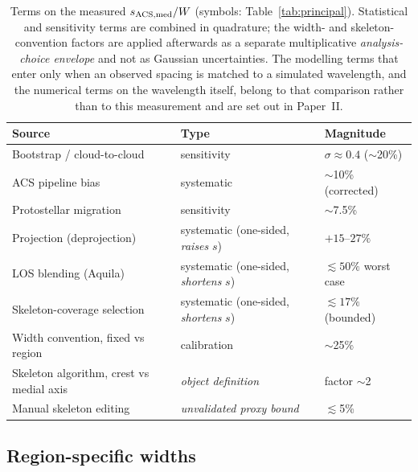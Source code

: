 \documentclass[usenatbib,twoside,twocolumn]{mnras}
\begin{document}
\begin{table}
\caption{Terms on the measured $s_{\rm ACS,med}/W$ (symbols: Table~\ref{tab:principal}). Statistical and sensitivity terms are combined in quadrature; the width- and skeleton-convention factors are applied afterwards as a separate multiplicative \emph{analysis-choice envelope} and not as Gaussian uncertainties. The modelling terms that enter only when an observed spacing is matched to a simulated wavelength, and the numerical terms on the wavelength itself, belong to that comparison rather than to this measurement and are set out in Paper~II.}
\label{tab:errorbudget}
\footnotesize
\setlength{\tabcolsep}{3pt}
\begin{tabular}{@{}p{3.1cm}p{1.9cm}p{2.3cm}@{}}
\toprule
Source & Type & Magnitude \\
\midrule
Bootstrap / cloud-to-cloud & sensitivity & $\sigma\approx0.4$ ($\sim$20\%) \\
ACS pipeline bias & systematic & $\sim$10\% (corrected) \\
Protostellar migration & sensitivity & $\sim$7.5\% \\
Projection (deprojection) & systematic (one-sided, \emph{raises} $s$) & $+15$--$27\%$ \\
LOS blending (Aquila) & systematic (one-sided, \emph{shortens} $s$) & $\lesssim50\%$ worst case \\
Skeleton-coverage selection & systematic (one-sided, \emph{shortens} $s$) & $\lesssim17\%$ (bounded) \\
Width convention, fixed vs region & calibration & $\sim$25\% \\
Skeleton algorithm, crest vs medial axis & \emph{object definition} & factor $\sim$2 \\
Manual skeleton editing & \emph{unvalidated proxy bound} & $\lesssim$5\% \\
\bottomrule
\end{tabular}
\end{table}


\subsection*{Region-specific widths}
\end{document}

